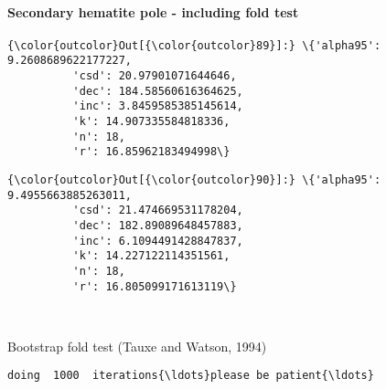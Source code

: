\documentclass[11pt]{article}
\begin{document}
    \paragraph{Secondary hematite pole - including fold
test}\label{secondary-hematite-pole---including-fold-test}




            \begin{Verbatim}[commandchars=\\\{\}]
{\color{outcolor}Out[{\color{outcolor}89}]:} \{'alpha95': 9.2608689622177227,
          'csd': 20.97901071644646,
          'dec': 184.58560616364625,
          'inc': 3.8459585385145614,
          'k': 14.907335584818336,
          'n': 18,
          'r': 16.85962183494998\}
\end{Verbatim}
        

            \begin{Verbatim}[commandchars=\\\{\}]
{\color{outcolor}Out[{\color{outcolor}90}]:} \{'alpha95': 9.4955663885263011,
          'csd': 21.474669531178204,
          'dec': 182.89089648457883,
          'inc': 6.1094491428847837,
          'k': 14.227122114351561,
          'n': 18,
          'r': 16.805099171613119\}
\end{Verbatim}
        

    \begin{center}
    \end{center}
    { \hspace*{\fill} \\}
    
    Bootstrap fold test (Tauxe and Watson, 1994)


    \begin{Verbatim}[commandchars=\\\{\}]
doing  1000  iterations{\ldots}please be patient{\ldots}
    \end{Verbatim}

    \begin{center}
    \end{center}
    { \hspace*{\fill} \\}
    
    \begin{center}
    \end{center}
    { \hspace*{\fill} \\}
    
\end{document}
